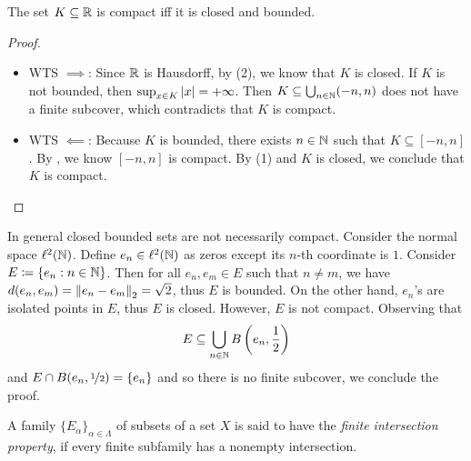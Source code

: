 \documentclass[screen]{techreport}
\numberwithin{equation}{section}
\begin{document}
\begin{theorem}\label{The:HeineBorelProperty}
	The set $K \subseteq \mathbb{R}$ is compact iff it is closed and bounded.
\end{theorem}
\begin{proof}\
	\begin{itemize}
		\item WTS ${\implies}$: Since $\mathbb{R}$ is Hausdorff, by (2), we know that $K$ is closed.
		If $K$ is not bounded, then $\sup_{x \in K} \left|{x}\right| = +\infty$.
		Then $K \subseteq \bigcup_{n \in \mathbb{N}} (-n,n)$ does not have a finite subcover, which contradicts that $K$ is compact.
		
		\item WTS ${\impliedby}$: Because $K$ is bounded, there exists $n \in \mathbb{N}$ such that $K \subseteq [-n,n]$.
		By \propref{ClosedIntervalCompact}, we know $[-n,n]$ is compact.
		By (1) and $K$ is closed, we conclude that $K$ is compact.
	\end{itemize}
\end{proof}

\begin{example}\label{Exa:ClosedBoundedNotCompact}
	In general closed bounded sets are not necessarily compact.
	Consider the normal space $\ell^2(\mathbb{N})$.
	Define $e_n \in \ell^2(\mathbb{N})$ as zeros except its $n$-th coordinate is $1$.
	Consider $E \coloneqq \left\{ {e_n : n \in \mathbb{N}} \right\}$.
	Then for all $e_n,e_m \in E$ such that $n\ne m$, we have $d(e_n,e_m) = \left\|{e_n - e_m}\right\|_2 = \sqrt{2}$, thus $E$ is bounded.
	On the other hand, $e_n$'s are isolated points in $E$, thus $E$ is closed.
	However, $E$ is not compact.
	Observing that
	\[
	E \subseteq \bigcup_{n \in \mathbb{N}} B\left({e_n, \frac{1}{2}}\right)
	\]
	and $E \cap B(e_n,\nicefrac{1}{2}) = \{ e_n \}$ and so there is no finite subcover,
	we conclude the proof.
\end{example}

\begin{definition}\label{De:FiniteIntersectionProperty}
	A family $\{E_\alpha\}_{\alpha \in \Lambda}$ of subsets of a set $X$ is said to have the \emph{finite intersection property}, if every finite subfamily has a nonempty intersection.
\end{definition}
\end{document}
